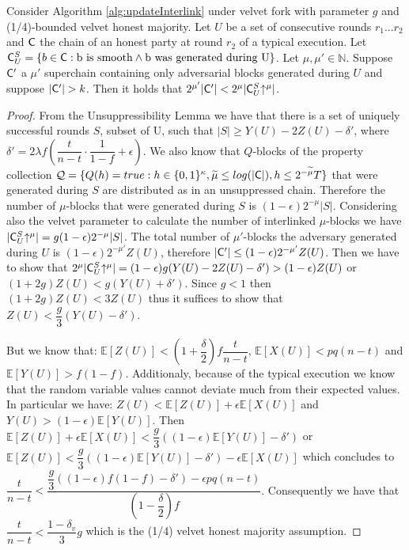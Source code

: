 \begin{lemma}
   Consider Algorithm \ref{alg:updateInterlink} under velvet fork with parameter $g$ and (1/4)-bounded velvet honest majority. Let $U$ be a set of consecutive rounds $r_1 ... r_2$ and $\mathsf{C}$ the chain of an honest party at round $r_2$ of a typical execution. Let $\mathsf{C}^S_U = \{b \in \mathsf{C}: \text{b is smooth} \wedge \text{b was generated during U} \}$. Let $\mu, \mu' \in \mathbb{N}$. Suppose $\mathsf{C}'$ a $\mu'$ superchain containing only adversarial blocks generated during $U$ and suppose $\lvert \mathsf{C}' \rvert > k$. Then it holds that $ 2^{\mu'}\lvert \mathsf{C}' \rvert < 2^{\mu}\lvert \mathsf{C}^S_U\negthickspace\uparrow^{\mu} \rvert $.
   \label{lem:claim3_lemma}
\end{lemma}
\begin{proof} From the Unsuppressibility Lemma we have that there is a set of uniquely successful rounds $S$, subset of U, such that $\lvert S \rvert \geq Y(U) - 2Z(U) - \delta'$, where $\delta' = 2 \lambda f (\dfrac{t}{n-t} \cdot \dfrac{1}{1-f} + \epsilon)$. We also know that $Q$-blocks of the property collection $\mathcal{Q} = \{Q(h) = true: h \in \{0,1\}^\kappa, \widetilde{\mu} \leq log(\lvert \mathsf{C} \rvert), h \leq 2^{-\widetilde{\mu}}T \}$ that were generated during $S$ are distributed as in an unsuppressed chain. Therefore the number of $\mu$-blocks that were generated during $S$ is $(1-\epsilon)2^{-\mu} \lvert S \rvert$. Considering also the velvet parameter to calculate the number of interlinked $\mu$-blocks we have $\lvert \mathsf{C}^S_U\negthickspace\uparrow^{\mu} \rvert = g(1-\epsilon)2^{-\mu} \lvert S \rvert$.  The total number of $\mu'$-blocks the adversary generated during $U$ is $(1-\epsilon)2^{-\mu'}Z(U)$, therefore $\lvert \mathsf{C}' \rvert \leq (1-\epsilon)2^{-\mu'}Z(U)$. Then we have to show that $2^{\mu}\lvert \mathsf{C}^S_U\negthickspace\uparrow^{\mu} \rvert = (1-\epsilon)g (Y(U) - 2Z(U) - \delta' ) > (1-\epsilon)Z(U)$ or $(1+2g)Z(U) < g(Y(U) + \delta')$. Since $g < 1$ then $(1+2g)Z(U) < 3Z(U)$ thus it suffices to show that $Z(U) < \dfrac{g}{3}(Y(U) - \delta')$.

But we know that\cite{backbone}: $\mathbb{E}[Z(U)] < (1+\dfrac{\delta}{2})f\dfrac{t}{n-t}$, $\mathbb{E}[X(U)] < pq(n-t)$ and $\mathbb{E}[Y(U)] > f(1-f)$. Additionaly, because of the typical execution we know that the random variable values cannot deviate much from their expected values. In particular we have\cite{backbone}: $Z(U) < \mathbb{E}[Z(U)] + \epsilon \mathbb{E}[X(U)]$ and $Y(U) > (1-\epsilon)\mathbb{E}[Y(U)]$. Then $\mathbb{E}[Z(U)] + \epsilon\mathbb{E}[X(U)] < \dfrac{g}{3}( (1-\epsilon)\mathbb{E}[Y(U)] -\delta')$ or $\mathbb{E}[Z(U)]  < \dfrac{g}{3}( (1-\epsilon)\mathbb{E}[Y(U)] -\delta') - \epsilon\mathbb{E}[X(U)]$ which concludes to $\dfrac{t}{n-t} < \dfrac{\dfrac{g}{3}((1-\epsilon)f(1-f)-\delta') - \epsilon pq(n-t)}{(1-\dfrac{\delta}{2})f}$. Consequently we have that $\dfrac{t}{n-t} < \dfrac{1-\delta_v}{3}g$ which is the (1/4) velvet honest majority assumption.
\end{proof}